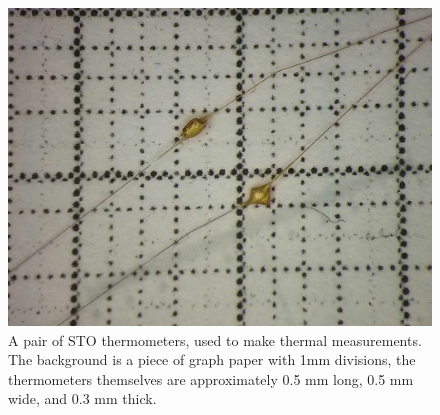 \documentclass{thesis-umich}
\begin{document}

\begin{figure} \caption[A Pair of STO thermometers]{A pair of STO thermometers, used to make thermal
  measurements. The background is a piece of graph paper with 1mm divisions, the
thermometers themselves are approximately 0.5 mm long, 0.5 mm wide, and 0.3 mm
thick.} \label{fig:thermo_pic}\centering
\includegraphics[width=\columnwidth]{figures/thermometers_apl.jpg}
\end{figure}
\end{document}
